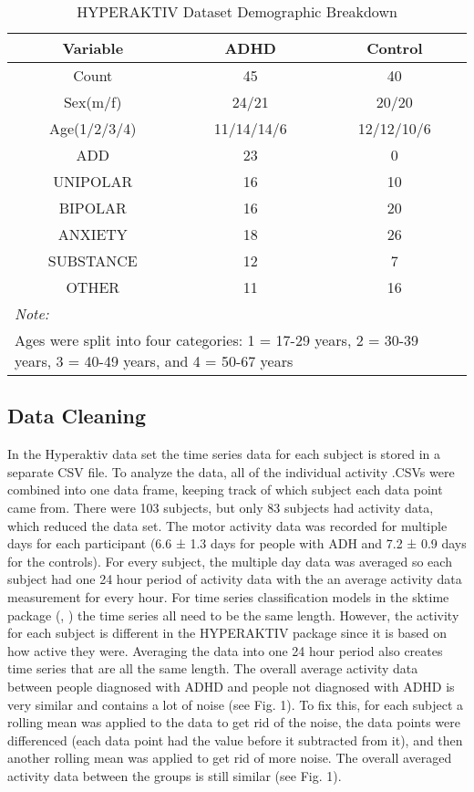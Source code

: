 \documentclass[,article,,moreauthors,pdftex]{mdpi}
\begin{document}
\begin{table}

\caption{\label{tab:tab:CellCount Plugin Summary}HYPERAKTIV Dataset Demographic Breakdown}
\centering
\begin{tabular}[t]{c|c|c}
\hline
Variable & ADHD & Control\\
\hline
Count & 45 & 40\\
\hline
Sex(m/f) & 24/21 & 20/20\\
\hline
Age(1/2/3/4) & 11/14/14/6 & 12/12/10/6\\
\hline
ADD & 23 & 0\\
\hline
UNIPOLAR & 16 & 10\\
\hline
BIPOLAR & 16 & 20\\
\hline
ANXIETY & 18 & 26\\
\hline
SUBSTANCE & 12 & 7\\
\hline
OTHER & 11 & 16\\
\hline
\multicolumn{3}{l}{\rule{0pt}{1em}\textit{Note: }}\\
\multicolumn{3}{l}{\rule{0pt}{1em}Ages were split into four categories: 1 = 17-29 years, 2 = 30-39 years, 3 = 40-49 years, and 4 = 50-67 years}\\
\end{tabular}
\end{table}

\hypertarget{data-cleaning}{%
\subsection{Data Cleaning}\label{data-cleaning}}

In the Hyperaktiv data set the time series data for each subject is
stored in a separate CSV file. To analyze the data, all of the
individual activity .CSVs were combined into one data frame, keeping
track of which subject each data point came from. There were 103
subjects, but only 83 subjects had activity data, which reduced the data
set. The motor activity data was recorded for multiple days for each
participant (6.6 ± 1.3 days for people with ADH and 7.2 ± 0.9 days for
the controls). For every subject, the multiple day data was averaged so
each subject had one 24 hour period of activity data with the an average
activity data measurement for every hour. For time series classification
models in the sktime package (\citet{loning_sktimesktime_2022},
\citet{loning_sktime_nodate}) the time series all need to be the same
length. However, the activity for each subject is different in the
HYPERAKTIV package since it is based on how active they were. Averaging
the data into one 24 hour period also creates time series that are all
the same length. The overall average activity data between people
diagnosed with ADHD and people not diagnosed with ADHD is very similar
and contains a lot of noise (see Fig. 1). To fix this, for each subject
a rolling mean was applied to the data to get rid of the noise, the data
points were differenced (each data point had the value before it
subtracted from it), and then another rolling mean was applied to get
rid of more noise. The overall averaged activity data between the groups
is still similar (see Fig. 1).
\end{document}

